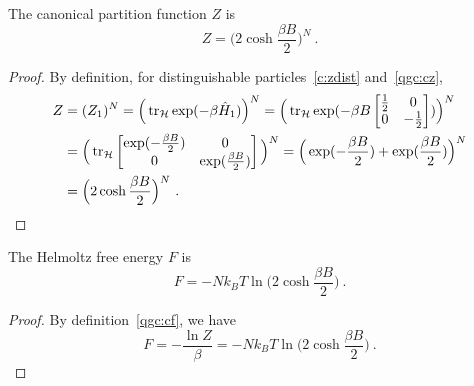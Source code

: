     The canonical partition function $Z$ is 
    \begin{equation*}
        Z = \Big ( 2 \cosh \frac{\beta B}{2} \Big)^N ~.
    \end{equation*}
    \begin{proof}
        By definition, for distinguishable particles~\eqref{c:zdist} and~\eqref{qgc:cz},
        \begin{equation*}
        \begin{aligned}
            Z & = (Z_1)^N = \Big (\operatorname{tr}_{\mathcal H} \exp(- \beta \hat H_1) \Big)^N = \Big (\operatorname{tr}_{\mathcal H} \exp(- \beta B \begin{bmatrix}
                \frac{1}{2} & 0 \\ 0 & - \frac{1}{2} \\ 
            \end{bmatrix}) \Big)^N \\ & = \Big(\operatorname{tr}_{\mathcal H} \begin{bmatrix}
                \exp(- \frac{\beta B}{2}) & 0 \\ 0 & \exp(\frac{\beta B}{2}) \\ 
            \end{bmatrix} \Big )^N = \Big( \exp(- \frac{\beta B}{2}) + \exp(\frac{\beta B}{2}) \Big)^N \\ & = \Big ( 2 \cosh \frac{\beta B}{2} \Big)^N ~.
        \end{aligned}
        \end{equation*}
    \end{proof}

    The Helmoltz free energy $F$ is 
    \begin{equation*}
        F = - N k_B T \ln \Big ( 2 \cosh \frac{\beta B}{2} \Big) ~.
    \end{equation*}
    \begin{proof}
        By definition~\eqref{qgc:cf}, we have
        \begin{equation*}
            F = - \frac{\ln Z}{\beta} = - N k_B T \ln \Big ( 2 \cosh \frac{\beta B}{2} \Big) ~.
        \end{equation*}
    \end{proof}

